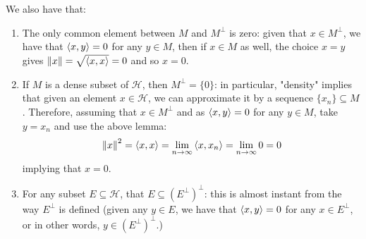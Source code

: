 We also have that:
\begin{enumerate}
    \item The only common element between $M$ and $M^{\perp}$ is zero: given that $x\in M^{\perp}$, we have that $\left\langle x, y \right\rangle=0$ for any $y\in M$, then if $x\in M$ as well, the choice $x=y$ gives \mbox{$\left\lVert x \right\rVert = \sqrt{\left\langle x, x \right\rangle} = 0$} and so $x=0$.
    \item If $M$ is a dense subset of $\mathcal{H}$, then \mbox{$M^{\perp} = \{0\}$}: in particular, "density" implies that given an element $x\in\mathcal{H}$, we can approximate it by a sequence $\{x_{n}\}\subseteq M$. Therefore, assuming that $x\in M^{\perp}$ and as \mbox{$\left\langle x, y \right\rangle = 0$} for any $y\in M$, take $y=x_{n}$ and use the above lemma:
    \[ \left\lVert x \right\rVert^{2} = \left\langle x, x \right\rangle = \lim_{n\to\infty} \left\langle x, x_{n} \right\rangle = \lim_{n\to\infty} 0 = 0 \]
    implying that $x=0$.
    \item For any subset \mbox{$E\subseteq\mathcal{H}$}, that \mbox{$E\subseteq (E^{\perp})^{\perp}$:} this is almost instant from the way $E^{\perp}$ is defined (given any $y\in E$, we have that $\left\langle x, y \right\rangle=0$ for any $x\in E^{\perp}$, or in other words, $y\in (E^{\perp})^{\perp}$.)
\end{enumerate}

